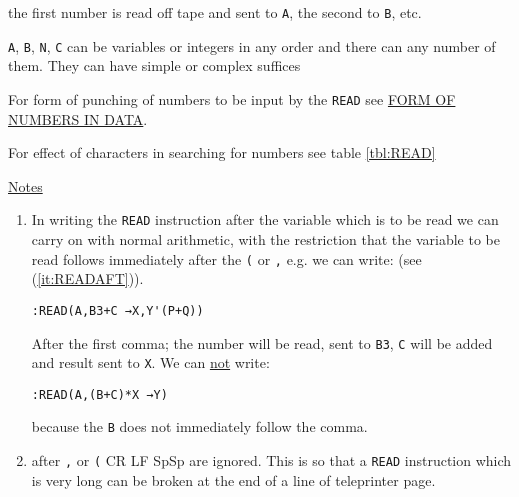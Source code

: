 \documentclass[10pt, a4paper, oneside]{article}
\newcommand{\myuline}[1]{\uline{#1}}
\newcommand{\mytt}[1]{\texttt{\scriptsize #1}}
\newcommand{\mytt}[1]{\texttt{\small #1}}
\begin{document}
\begin{multicols}{2}
the first number is read off tape and sent to \mytt{A}, the
second to \mytt{B}, etc.

\mytt{A}, \mytt{B}, \mytt{N}, \mytt{C} can be variables or integers in any
order and there can any number of them.  They can
have simple or complex suffices

For form of punching of numbers to be input by the
\mytt{READ} see \myuline{FORM OF NUMBERS IN DATA}.

For effect of characters in searching for numbers
see table \ref{tbl:READ}

\begin{flushleft}
\myuline{Notes}
\end{flushleft}

\renewcommand{\labelenumi}{(\roman{enumi})}
\begin{enumerate}
\def\theenumi{\roman{enumi}}

\item\label{it:READARITH} In writing the \mytt{READ} instruction after the variable
which is to be read we can carry on with normal
arithmetic, with the restriction that the variable to
be read follows immediately after the \mytt{(} or \mytt{,} e.g. we
can write: (see (\ref{it:READAFT})).

\begin{addmargin}[1cm]{1em}%
\begin{lstlisting}
:READ(A,B3+C →X,Y'(P+Q))
\end{lstlisting}
\end{addmargin}

After the first comma; the number will be read,
sent to \mytt{B3}, \mytt{C} will be added and result sent to \mytt{X}.  We
can \myuline{not} write:

\begin{addmargin}[1cm]{1em}%
\begin{lstlisting}
:READ(A,(B+C)*X →Y)
\end{lstlisting}
\end{addmargin}

because the \mytt{B} does not
immediately follow the comma.

\item\label{it:READAFT} after \mytt{,} or \mytt{(} CR LF SpSp are ignored.
This is so that a \mytt{READ} instruction which is very long can be broken
at the end of a line of teleprinter page.

\end{enumerate}


\end{multicols}
\end{document}
